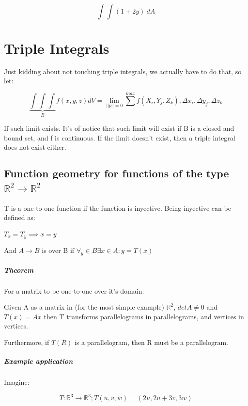 \documentclass[11pt,fleqn]{book} %
\begin{document}
\paragraph*{$$\int \int (1 + 2y) \ dA $$}

\chapter{Triple Integrals}

Just kidding about not touching triple integrals, we actually have to do that, so let:

\begin{equation}
    \underbrace{\int\int\int}_{B} f(x,y,z) dV = \lim_{||p|| = 0} \sum_{}^{max} f(X_i,Y_j,Z_k); \Delta x_i, \Delta y_j, \Delta z_k
\end{equation}

If such limit exists. It's of notice that such limit will exist if B is a closed and bound set, and f is continuous.
If the limit doesn't exist, then a triple integral does not exist either.

\section{Function geometry for functions of the type $\mathbb{R}^2 \to \mathbb{R}^2$}

T is a one-to-one function if the function is inyective. Being inyective can be defined as:

$T_x = T_y \implies x=y$

And $ A \to B $ is over B if $ \forall_y \in B \exists x \in A : y = T(x) $

\paragraph*{Theorem}
For a matrix to be one-to-one over it's domain:

Given A as a matrix in (for the most simple example) $\mathbb{R}^2$, $det A \neq 0$ and $T(x) = Ax$ then T transforms parallelograms in parallelograms, and
vertices in vertices. 

Furthermore, if $T(R)$ is a parallelogram, then R must be a parallelogram.

\paragraph*{Example application}
Imagine: 

\begin{equation}
    T: \mathbb{R}^3 \to \mathbb{R}^3; T(u,v,w) = (2u, 2u+3v, 3w)
\end{equation}
\end{document}
